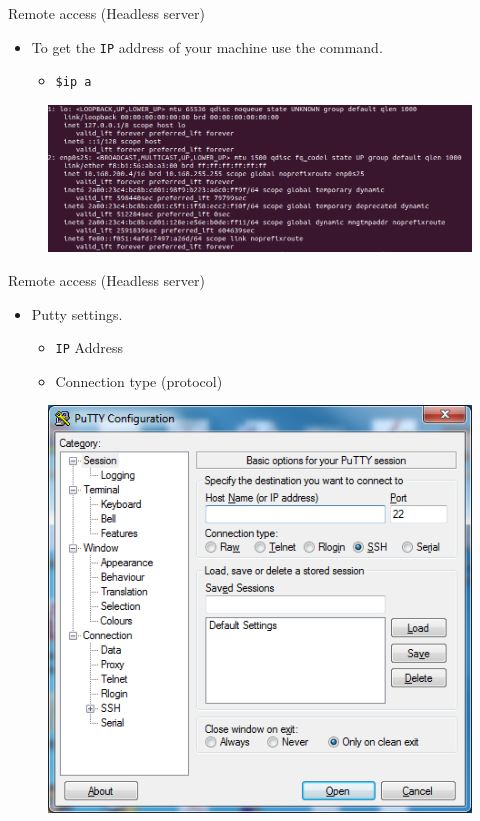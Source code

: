 \documentclass[aspectratio=169]{beamer}
\begin{document}
\begin{frame}{Remote access (Headless server)}
  \begin{itemize}
    \item To get the \texttt{IP} address of your machine use the command.
      \begin{itemize}
        \item \texttt{\$ip a}
      \end{itemize}
  \end{itemize}
  \begin{figure}
    \begin{center}
      \includegraphics[width=.65\linewidth]{ip.png}
    \end{center}
  \end{figure}
\end{frame}

\begin{frame}{Remote access (Headless server)}
  \begin{itemize}
    \item Putty settings.
      \begin{itemize}
        \item \texttt{IP} Address
        \item Connection type (protocol)
      \end{itemize}
  \end{itemize}
  \begin{figure}
    \begin{center}
      \includegraphics[width=0.35\linewidth]{Putty1.png}
    \end{center}
  \end{figure}
\end{frame}
\end{document}

